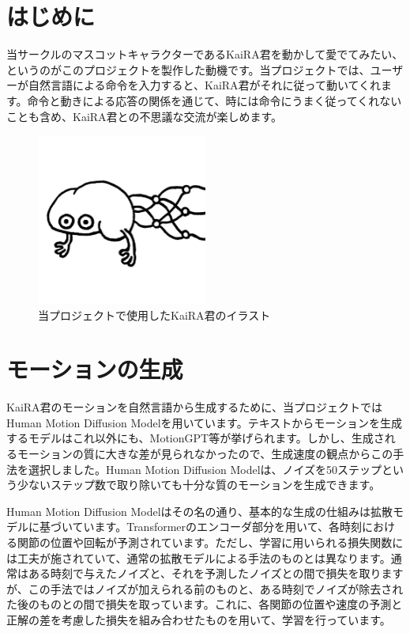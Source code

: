 \section{はじめに}

当サークルのマスコットキャラクターであるKaiRA君を動かして愛でてみたい、というのがこのプロジェクトを製作した動機です。当プロジェクトでは、ユーザーが自然言語による命令を入力すると、KaiRA君がそれに従って動いてくれます。命令と動きによる応答の関係を通じて、時には命令にうまく従ってくれないことも含め、KaiRA君との不思議な交流が楽しめます。

\begin{figure}[htbp]
    \centering
    \includegraphics[width=0.5\textwidth]{moving-kaira-kun/fig/kaira_kun.png}
    \caption{当プロジェクトで使用したKaiRA君のイラスト}
    \label{fig:kaira_kun}
\end{figure}

\section{モーションの生成}

KaiRA君のモーションを自然言語から生成するために、当プロジェクトではHuman Motion Diffusion Model\cite{tevet2022humanmotiondiffusionmodel}を用いています。テキストからモーションを生成するモデルはこれ以外にも、MotionGPT\cite{jiang2023motiongpthumanmotionforeign}等が挙げられます。しかし、生成されるモーションの質に大きな差が見られなかったので、生成速度の観点からこの手法を選択しました。Human Motion Diffusion Modelは、ノイズを50ステップという少ないステップ数で取り除いても十分な質のモーションを生成できます。

Human Motion Diffusion Modelはその名の通り、基本的な生成の仕組みは拡散モデルに基づいています。Transformerのエンコーダ部分を用いて、各時刻における関節の位置や回転が予測されています。ただし、学習に用いられる損失関数には工夫が施されていて、通常の拡散モデルによる手法のものとは異なります。通常はある時刻で与えたノイズと、それを予測したノイズとの間で損失を取りますが、この手法ではノイズが加えられる前のものと、ある時刻でノイズが除去された後のものとの間で損失を取っています。これに、各関節の位置や速度の予測と正解の差を考慮した損失を組み合わせたものを用いて、学習を行っています。

